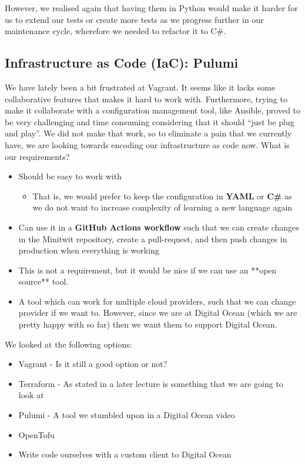 However, we realised again that having them in Python would make it harder for us to extend our tests or create more tests as we progress further in our maintenance cycle, wherefore we needed to refactor it to C\#.

\subsection{Infrastructure as Code (IaC): Pulumi}

We have lately been a bit frustrated at Vagrant. It seems like it lacks some collaborative features that makes it hard to work with. Furthermore, trying to make it collaborate with a configuration management tool, like Ansible, proved to be very challenging and time consuming considering that it should “just be plug and play”. We did not make that work, so to eliminate a pain that we currently have, we are looking towards encoding our infrastructure as code now. What is our requirements?

\begin{itemize}
    \item Should be easy to work with
    \begin{itemize}
        \item That is, we would prefer to keep the configuration in \textbf{YAML} or \textbf{C\#} as we do not want to increase complexity of learning a new language again
    \end{itemize}
    \item Can use it in a \textbf{GitHub Actions workflow} such that we can create changes in the Minitwit repository, create a pull-request, and then push changes in production when everything is working
    \item This is not a requirement, but it would be nice if we can use an **open source** tool.
    \item A tool which can work for multiple cloud providers, such that we can change provider if we want to. However, since we are at Digital Ocean (which we are pretty happy with so far) then we want them to support Digital Ocean.
\end{itemize}

We looked at the following options:
\begin{itemize}
    \item Vagrant - Is it still a good option or not?
    \item Terraform - As stated in a later lecture is something that we are going to look at
    \item Pulumi - A tool we stumbled upon in a Digital Ocean video
    \item OpenTofu
    \item Write code ourselves with a custom client to Digital Ocean
\end{itemize}

